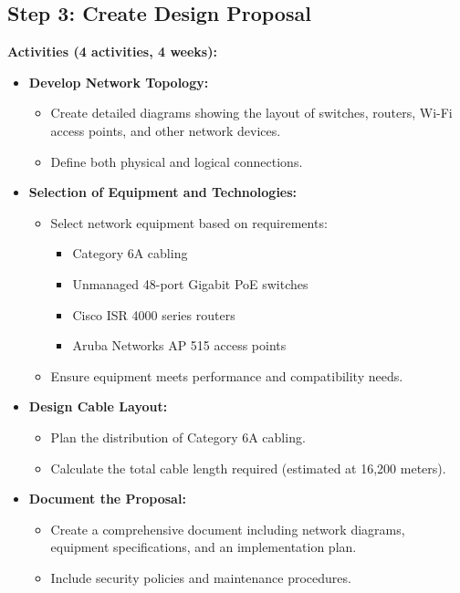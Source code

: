 \documentclass[12pt]{article}
\begin{document}
\subsection{Step 3: Create Design Proposal}

\textbf{Activities (4 activities, 4 weeks):}

\begin{itemize}
    \item \textbf{Develop Network Topology:}
        \begin{itemize}
            \item Create detailed diagrams showing the layout of switches, routers, Wi-Fi access points, and other network devices.
            \item Define both physical and logical connections.
        \end{itemize}
    \item \textbf{Selection of Equipment and Technologies:}
        \begin{itemize}
            \item Select network equipment based on requirements:
                \begin{itemize}
                    \item Category 6A cabling
                    \item Unmanaged 48-port Gigabit PoE switches
                    \item Cisco ISR 4000 series routers
                    \item Aruba Networks AP 515 access points
                \end{itemize}
            \item Ensure equipment meets performance and compatibility needs.
        \end{itemize}
    \item \textbf{Design Cable Layout:}
        \begin{itemize}
            \item Plan the distribution of Category 6A cabling.
            \item Calculate the total cable length required (estimated at 16,200 meters).
        \end{itemize}
    \item \textbf{Document the Proposal:}
        \begin{itemize}
            \item Create a comprehensive document including network diagrams, equipment specifications, and an implementation plan.
            \item Include security policies and maintenance procedures.
        \end{itemize}
\end{itemize}
\end{document}
